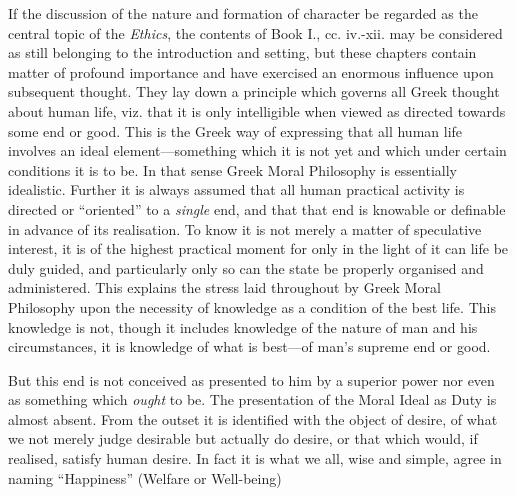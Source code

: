 If the discussion of the nature and formation of character be regarded as the
central topic of the \emph{Ethics}, the contents of Book I., cc. iv.-xii. may
be considered as still belonging to the introduction and setting, but these
chapters contain matter of profound importance and have exercised an enormous
influence upon subsequent thought. They lay down a principle which governs all
Greek thought about human life, viz. that it is only intelligible when viewed
as directed towards some end or good. This is the Greek way of expressing that
all human life involves an ideal element—something which it is not yet
and which under certain conditions it is to be. In that sense Greek Moral
Philosophy is essentially idealistic. Further it is always assumed that all
human practical activity is directed or “oriented” to a
\emph{single} end, and that that end is knowable or definable in advance of its
realisation. To know it is not merely a matter of speculative interest, it is
of the highest practical moment for only in the light of it can life be duly
guided, and particularly only so can the state be properly organised and
administered. This explains the stress laid throughout by Greek Moral
Philosophy upon the necessity of knowledge as a condition of the best life.
This knowledge is not, though it includes knowledge of the nature of man and
his circumstances, it is knowledge of what is best—of man’s supreme
end or good.

But this end is not conceived as presented to him by a superior power nor even
as something which \emph{ought} to be. The presentation of the Moral Ideal as
Duty is almost absent. From the outset it is identified with the object of
desire, of what we not merely judge desirable but actually do desire, or that
which would, if realised, satisfy human desire. In fact it is what we all, wise
and simple, agree in naming “Happiness” (Welfare or Well-being)

